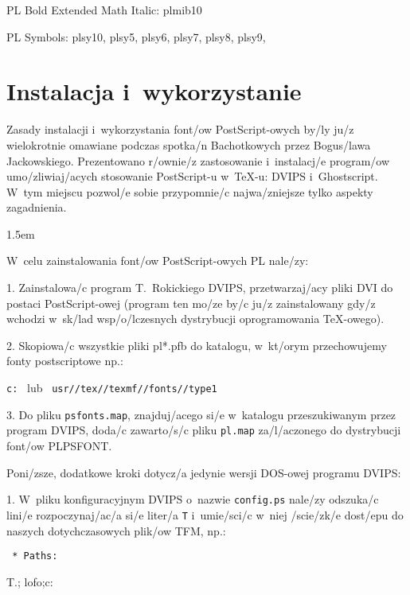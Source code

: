 {\sst PL Bold Extended Math Italic}: plmib10
\vskip 4pt

\vbox{{\sst PL Symbols}: plsy10, plsy5, plsy6, plsy7, plsy8, plsy9,
}
\eject
\chapter{Instalacja i~wykorzystanie}

\baselineskip 12pt
Zasady instalacji i~wykorzystania font/ow PostScript-owych by/ly ju/z
wielokrotnie omawiane podczas spotka/n Bachotkowych przez Bogus/lawa
Jackowskiego. Prezentowano r/ownie/z zastosowanie i~instalacj/e program/ow
umo/zliwiaj/acych stosowanie PostScript-u w~\TeX-u: DVIPS i~Ghostscript.
W~tym miejscu pozwol/e sobie przypomnie/c najwa/zniejsze tylko aspekty
zagadnienia.

\parindent 1.5em

W~celu zainstalowania font/ow PostScript-owych PL nale/zy:

\smallskip

\item{1.} Zainstalowa/c program T.~Rokickiego DVIPS, przetwarzaj/acy 
pliki DVI do postaci PostScript-owej (program ten mo/ze by/c ju/z
zainstalowany gdy/z wchodzi w~sk/lad wsp/o/lczesnych dystrybucji
oprogramowania \TeX-owego).

\medskip
\item{2.} Skopiowa/c wszystkie pliki pl*.pfb do katalogu, w~kt/orym
przechowujemy fonty postscriptowe np.:

\medskip
{\tt c:\string\tex\string\texmf\string\fonts\string{}} \ lub \
{\tt usr//tex//texmf//fonts//type1}
\medskip

\item{3.} Do pliku {\tt psfonts.map}, znajduj/acego si/e w~katalogu 
przeszukiwanym przez program DVIPS, doda/c zawarto/s/c pliku 
{\tt pl.map} za/l/aczonego do dystrybucji font/ow PLPSFONT.

\medskip
Poni/zsze, dodatkowe kroki dotycz/a jedynie wersji DOS-owej programu DVIPS:

\medskip
\item{1.} W~pliku konfiguracyjnym DVIPS o~nazwie {\tt config.ps} nale/zy
odszuka/c lini/e rozpoczynaj/ac/a si/e liter/a {\tt T} i~umie/sci/c w~niej 
/scie/zk/e dost/epu do naszych dotychczasowych plik/ow TFM, np.:
\medskip

{\tt
* Paths:

T.; lofo;c:\string\tex\string\tfm
}
\medskip

